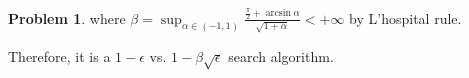\documentclass[a4paper]{article}
\theoremstyle{definition}
\newtheorem{problem}{Problem}
\theoremstyle{plain}
\newcommand{\Ebb}{\mathbb E}
\newcommand{\dps}{\displaystyle}
\newcommand{\<}{\left<}
\renewcommand{\>}{\right>}
\numberwithin{equation}{problem}
\begin{document}
\begin{problem}
  where  $ \beta=\sup_{\alpha\in(-1,1)}\frac{\frac{\pi}{2}+\arcsin \alpha}{\sqrt{1+\alpha}}<+\infty $ by L'hospital rule.

  Therefore, it is a  $ 1-\epsilon $ vs.  $ 1-\beta\sqrt{\epsilon} $ search algorithm.




\end{problem}
\end{document}

